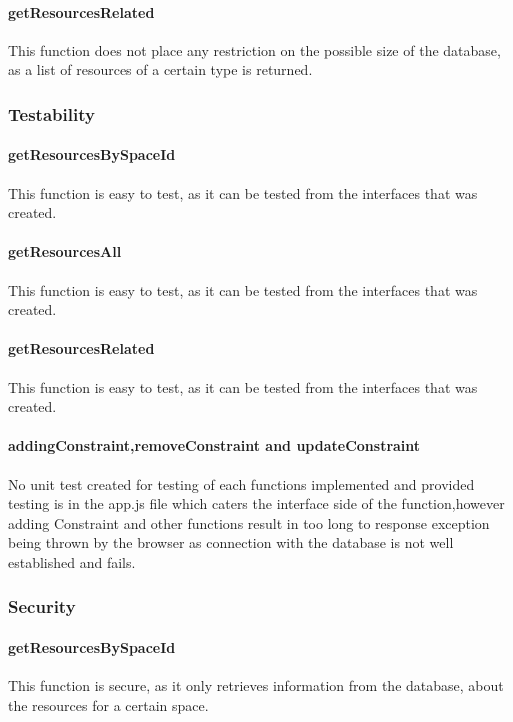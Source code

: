 \documentclass[a4paper]{article}
\begin{document}
\paragraph{getResourcesRelated}
This function does not place any restriction on the possible size of the database, as a list of resources of a certain type is returned.

\subsubsection {Testability}

\paragraph{getResourcesBySpaceId}
This function is easy to test, as it can be tested from the interfaces that was created.

\paragraph{getResourcesAll}
This function is easy to test, as it can be tested from the interfaces that was created.

\paragraph{getResourcesRelated}
This function is easy to test, as it can be tested from the interfaces that was created.

\paragraph{addingConstraint,removeConstraint and updateConstraint}
No unit test created for testing of each functions implemented and provided testing is in the app.js file which caters the interface side of the function,however adding Constraint and other functions result in too long to response exception being thrown by the browser as connection with the database is not well established and fails.

\subsubsection {Security}

\paragraph{getResourcesBySpaceId}
This function is secure, as it only retrieves information from the database, about the resources for a certain space.
\end{document}
